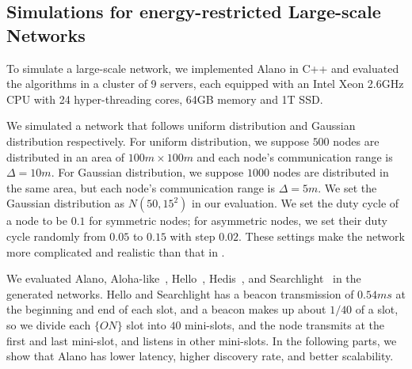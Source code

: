 \subsection{Simulations for energy-restricted Large-scale Networks}


To simulate a large-scale network, we implemented Alano in C++ and evaluated the algorithms in a cluster of 9 servers,
each equipped with an Intel Xeon 2.6GHz CPU with 24 hyper-threading cores, 64GB memory and 1T SSD.

We simulated a network that follows uniform distribution and Gaussian distribution respectively.
For uniform distribution, we suppose $500$ nodes are distributed in an area of $100m \times 100m$ 
and each node's communication range is $\Delta = 10m$. For Gaussian distribution, we suppose 
$1000$ nodes are distributed in the same area, but each node's communication range is $\Delta = 5m$. 
We set the Gaussian distribution as $N(50,15^2)$ in our evaluation.
We set the duty cycle of a node to be $0.1$ for symmetric nodes; 
for asymmetric nodes, we set their duty cycle randomly from $0.05$ to $0.15$ with step $0.02$.
These settings make the network more complicated and realistic than that in
\cite{wang2015blinddate, sun2014hello, bakht2012searchlight,
chen2015heterogeneous, kandhalu2010u, you2011aloha,
mcglynn2001birthday, song2014probabilistic, vasudevan2009neighbor}.


We evaluated Alano, Aloha-like~\cite{you2011aloha}, Hello~\cite{sun2014hello}, Hedis~\cite{chen2015heterogeneous}, and Searchlight~\cite{bakht2012searchlight} in the generated networks. %
Hello and Searchlight has a beacon transmission of $0.54ms$ at the beginning and end of each slot, and a beacon makes up about $1/40$ of a slot, so we divide each $\{ON\}$ slot into $40$ mini-slots, and the node transmits at the first and last mini-slot, and listens in other mini-slots.
In the following parts, we show that Alano has lower latency, higher discovery rate, and better scalability. %




